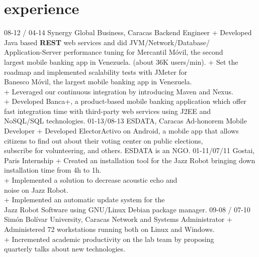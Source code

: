 \documentclass[]{friggeri-cv}
\begin{document}
\section{experience}

\begin{entrylist}
  \entry
    {\small 08-12 / 04-14}
    {Synergy Global Business, Caracas}
    {Backend Engineer}
    {+ Developed Java based  \textbf{REST} web services and did JVM/Network/Database/\\
        Application-Server  performance tuning for Mercantil Móvil, the second\\
        largest mobile banking app in Venezuela. (about 36K users/min).
     + Set the roadmap and implemented scalability tests with JMeter for\\
         Banesco Móvil, the largest mobile banking app in Venezuela.\\
     + Leveraged our continuous integration by introducing Maven and Nexus.\\
     + Developed Banca+, a product-based mobile banking application which offer\\
        fast integration time with third-party web services using J2EE and\\
        NoSQL/SQL technologies.}
  \entry
    {\small 01-13/08-13}
    {ESDATA, Caracas}
    {Ad-honorem Mobile Developer}
    {+ Developed ElectorActivo on Android, a mobile app that allows\\
         citizens to ﬁnd out about their voting center on public elections,\\
         subscribe for volunteering, and others. ESDATA is an NGO.}
  \entry
    {\small 01-11/07/11}
    {Gostai, Paris}
    {Internship}
    {+ Created an installation tool for the Jazz Robot bringing down\\
          installation time from 4h to 1h.\\
      + Implemented a solution to decrease acoustic echo and\\
          noise on Jazz Robot.\\
      + Implemented an automatic update system for the\\
          Jazz Robot Software using GNU/Linux Debian package manager.}
  \entry
    {\small 09-08 / 07-10}
    {Simón Bolívar University, Caracas}
    {Network and Systems Administrator}
    {+ Administered 72 workstations running both on Linux and Windows.\\
     + Incremented academic productivity on the lab team by proposing\\
         quarterly talks about new technologies.}
\end{entrylist}
\end{document}
